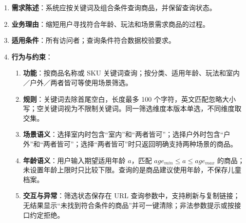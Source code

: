 
\begin{enumerate}
\item {\bfseries 需求陈述}：系统应按关键词及组合条件查询商品，并保留查询状态。
\item {\bfseries 业务理由}：缩短用户寻找符合年龄、玩法和场景需求商品的过程。
\item {\bfseries 适用条件}：所有访问者；查询条件符合数据校验要求。
\item {\bfseries 行为与约束}：
\begin{enumerate}
\item {\bfseries 功能}：按商品名称或 SKU 关键词查询；按分类、适用年龄、玩法和室内／户外／两者皆可等使用场景筛选。
\item {\bfseries 规则}：关键词去除首尾空白，长度最多 100 个字符，英文匹配忽略大小写；空关键词视为不限制关键词。同一筛选维度本版本单选，不同维度取交集。
\item {\bfseries 场景语义}：选择室内时包含“室内”和“两者皆可”；选择户外时包含“户外”和“两者皆可”；选择“两者皆可”时只返回明确支持两种场景的商品。
\item {\bfseries 年龄语义}：用户输入期望适用年龄 \(a\)，匹配 \(age_{min}\leq a\leq age_{max}\) 的商品；未设置年龄上限时只比较下限。查询的是商品建议使用年龄，不保存儿童档案。
\item {\bfseries 交互与异常}：筛选状态保存在 URL 查询参数中，支持刷新与复制链接；无结果显示“未找到符合条件的商品”并可一键清除；非法参数提示或按接口约定拒绝。
\end{enumerate}

\end{enumerate}


